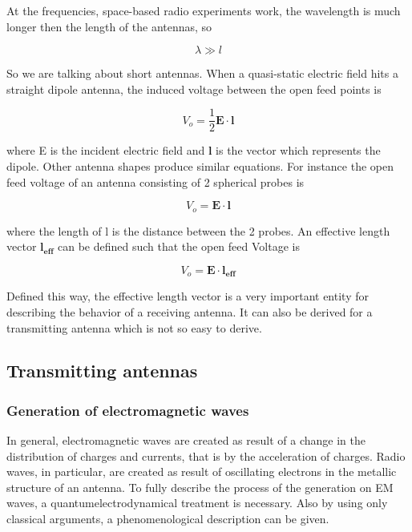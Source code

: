 \documentclass[a4paper,11pt]{report}
\begin{document}
At the frequencies, space-based radio experiments work, the wavelength is much longer then the length of the antennas, so

\begin{equation}
 \lambda \gg l
\end{equation}

So we are talking about short antennas. When a quasi-static electric field hits a straight dipole antenna, the induced voltage between the open feed points is

\begin{equation}
 V_o=\frac{1}{2} \mathbf{E}\cdot \mathbf{l}
\end{equation}

where E is the incident electric field and $\mathbf{l}$ is the vector which represents the dipole. Other antenna shapes produce similar equations. For instance the open feed voltage of an antenna consisting of 2 spherical probes is

\begin{equation}
 V_o=\mathbf{E}\cdot \mathbf{l}
\end{equation}

where the length of l is the distance between the 2 probes. An effective length vector $\mathbf{l_{eff}}$ can be defined such that the open feed Voltage is

\begin{equation}
 V_o=\mathbf{E}\cdot \mathbf{l_{eff}}
\end{equation}

Defined this way, the effective length vector is a very important entity for describing the behavior of a receiving antenna. It can also be derived for a transmitting antenna which is not so easy to derive.

\subsection{Transmitting antennas}
\subsubsection{Generation of electromagnetic waves}
In general, electromagnetic waves are created as result of a change in the distribution of charges and currents, that is by the acceleration of charges. Radio waves, in particular, are created as result of oscillating electrons in the metallic structure of an antenna. To fully describe the process of the generation on EM waves, a quantumelectrodynamical treatment is necessary. Also by using only classical arguments, a phenomenological description can be given.\\
\end{document}
